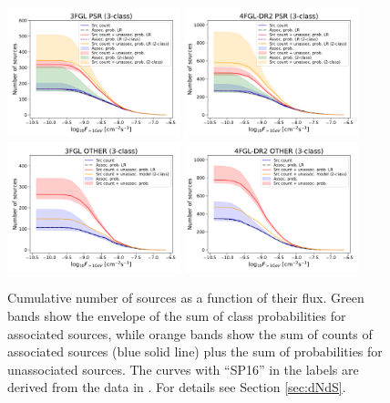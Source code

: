 \begin{figure}[h]
\center
\includegraphics[width=0.45\textwidth]{plots/N_logS_3FGL_PSR_3classes.pdf}
\includegraphics[width=0.45\textwidth]{plots/N_logS_4FGL-DR2_PSR_3classes.pdf} \\
\includegraphics[width=0.45\textwidth]{plots/N_logS_3FGL_OTHER_3classes.pdf}
\includegraphics[width=0.45\textwidth]{plots/N_logS_4FGL-DR2_OTHER_3classes.pdf}
\caption{Cumulative number of sources as a function of their flux. Green bands show the envelope of the sum of class probabilities for associated sources, while orange bands show the sum of counts of associated sources (blue solid line) plus the sum of probabilities for unassociated sources. The curves with ``SP16'' in the labels are derived from the data in \cite{2016ApJ...820....8S}. For details see Section \ref{sec:dNdS}.}  
\label{fig:logN_logS_3classes}
\end{figure}



